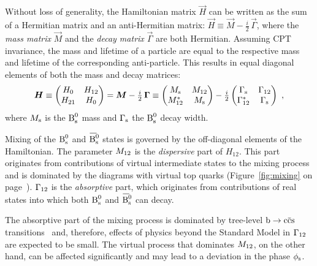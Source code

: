 Without loss of generality, the Hamiltonian matrix $\vec{H}$ can be written as the sum of a Hermitian matrix and an anti-Hermitian matrix:
$\vec{H} \equiv \vec{M} - \tfrac{i}{2}\,\vec{\Gamma}$, where the \emph{mass matrix} $\vec{M}$ and the \emph{decay matrix} $\vec{\Gamma}$
are both Hermitian. Assuming CPT invariance, the mass and lifetime of a particle are equal to the respective mass and lifetime of the
corresponding anti-particle. This results in equal diagonal elements of both the mass and decay matrices:
\begin{equation}
  \label{eq:timeEvolHamil}
  \bm{H}
    \equiv \begin{pmatrix} H_0 & H_{12} \\ H_{21} & H_0 \end{pmatrix}
    = \bm{M} - \tfrac{i}{2}\,\bm{\Gamma}
    \equiv \begin{pmatrix} M_\text{s} & M_\text{12} \\ M_\text{12}^* & M_\text{s} \end{pmatrix}
      - \tfrac{i}{2} \begin{pmatrix} \Gamma_\text{s} & \Gamma_\text{12} \\ \Gamma_\text{12}^* & \Gamma_\text{s} \end{pmatrix}
    \ ,
\end{equation}
where $M_\text{s}$ is the $\text{B}_\text{s}^\text{0}$ mass and $\Gamma_\text{s}$ the $\text{B}_\text{s}^\text{0}$ decay width.

Mixing of the $\text{B}_\text{s}^\text{0}$ and $\Bsbar$ states is governed by the off-diagonal elements of the Hamiltonian. The parameter $M_\text{12}$ is the
\emph{dispersive} part of $H_{12}$. This part originates from contributions of virtual intermediate states to the mixing process and is
dominated by the diagrams with virtual top quarks (Figure~\ref{fig:mixing} on page~\pageref{fig:mixing}). $\Gamma_\text{12}$ is the \emph{absorptive}
part, which originates from contributions of real states into which both $\text{B}_\text{s}^\text{0}$ and $\Bsbar$ can decay.

The absorptive part of the mixing process is dominated by tree-level $\btoccs$ transitions~\cite{Lenz:2006hd,*Lenz:2011ti} and, therefore,
effects of physics beyond the Standard Model in $\Gamma_\text{12}$ are expected to be small. The virtual process that dominates $M_\text{12}$, on the other
hand, can be affected significantly and may lead to a deviation in the phase $\phi_\text{s}$.

